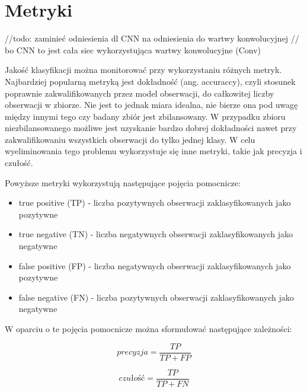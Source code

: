\newpage %
\section{Metryki}

//todo: zaminieć odniesienia dl CNN na odniesienia do wartwy konwolucyjnej
// bo CNN to jest cała siec wykorzystująca wartwy konwolucyjne (Conv)

Jakość klasyfikacji można monitorować przy wykorzystaniu różnych metryk. Najbardziej popularną metryką jest dokładność (ang. accuraccy), czyli stosunek poprawnie zakwalifikowanych przez model obserwacji, do całkowitej liczby obserwacji w zbiorze. Nie jest to jednak miara idealna, nie bierze ona pod uwagę między innymi tego czy badany zbiór jest zbilansowany. W przypadku zbioru niezbilansowanego możliwe jest uzyskanie bardzo dobrej dokładności nawet przy zakwalifikowaniu wszystkich obserwacji do tylko jednej klasy. W celu wyeliminowania tego problemu wykorzystuje się inne metryki, takie jak precyzja i czułość.



Powyższe metryki wykorzystują następujące pojęcia pomocnicze:
\begin{itemize}
    \item true positive (TP) - liczba pozytywnych obserwacji zaklasyfikowanych jako pozytywne
    \item true negative (TN) - liczba negatywnych obserwacji zaklasyfikowanych jako negatywne
    \item false positive (FP) - liczba negatywnych obserwacji zaklasyfikowanych jako pozytywne
    \item false negative (FN) - liczba pozytywnych obserwacji zaklasyfikowanych jako negatywne
\end{itemize}


W oparciu o te pojęcia pomocnicze można sformułować następujące zależności:


$$
    precyzja = \frac{TP}{TP + FP}
$$

$$
    czułość = \frac{TP}{TP + FN}
$$




